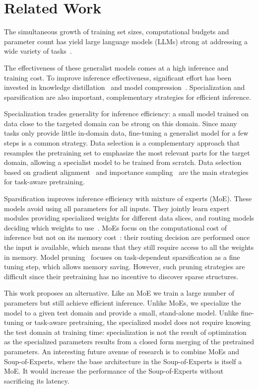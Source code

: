 \section{Related Work}
\label{sec:related}
The simultaneous growth of training set sizes, computational budgets and parameter count 
has yield large language models (LLMs) strong at addressing a wide variety of tasks~\cite{brown2020gpt3,jiang2023mistral,dubey2024llama}.

The effectiveness of these generalist models comes at a high inference and training cost.
To improve inference effectiveness, significant effort has been invested in knowledge distillation~\cite{gu2024minillm,riviere2024gemma} and model compression~\cite{li2024quantized,wan2024efficient}.
Specialization and sparsification are also important, complementary strategies for efficient inference.

Specialization trades generality for inference efficiency: a small model trained on data close to the targeted domain can be strong on this domain. Since many tasks only provide little in-domain data, fine-tuning a generalist model for a few steps is a common strategy. Data selection is a complementary approach that resamples the pretraining set to emphasize the most relevant parts for the target domain, 
allowing a specialist model to be trained from scratch. Data selection based on gradient alignment~\cite{fan2023doge,fan2024dynamic,grangier2024adaptive,wang2024greats} and importance sampling~\cite{grangier2024task} are the main strategies for task-aware pretraining.

Sparsification improves inference efficiency with mixture of experts (MoE). These models avoid using all parameters for all inputs. They jointly learn expert modules providing specialized weights for different data slices, and routing models deciding which weights to use~\cite{shazeer2017moe,fedus2022switch,jiang2024mixtral,dai2024deepseekmoe,abnar2025parameters}. 
MoEs focus on the computational cost of inference but not on its memory cost~\cite{pan2024dense}: their routing decision are performed once the input is available, which means that they still require access to all the weights in memory. Model pruning~\cite{xia2022pruning,xia2023sheared,ma2023llmpruner} focuses on task-dependent sparsification as a fine tuning step, which allows memory saving. However, such pruning strategies are difficult since their pretraining has no incentive to discover sparse structures.

This work proposes an alternative. Like an MoE we train a large number of parameters but still achieve efficient inference.
Unlike MoEs, we specialize the model to a given test domain and provide a small, stand-alone model. Unlike fine-tuning or task-aware pretraining, 
the specialized model does not require knowing the test domain at training time: specialization is not the result of optimization as the 
specialized parameters results from a closed form merging of the pretrained parameters.
%
An interesting future avenue of research is to combine MoEs and Soup-of-Experts, where the base architecture in the Soup-of-Experts is itself a MoE. It would increase the performance of the Soup-of-Experts without sacrificing its latency.

